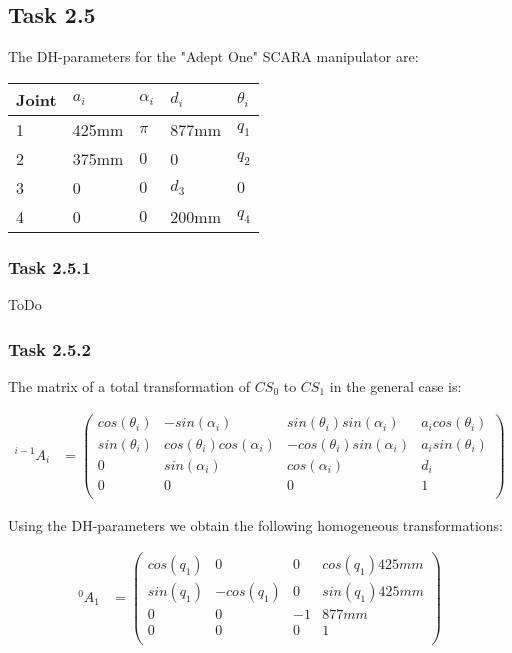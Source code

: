 \subsection*{Task 2.5}
The DH-parameters for the "Adept One" SCARA manipulator are:
\begin{center}
	\begin{tabular}{ | l | l | l | l | l |}
		\hline
		Joint & $a_{i}$ & $\alpha_{i}$ & $d_i$ & $\theta_i$ \\ \hline
		1 & 425mm & $\pi$ & 877mm & $q_1$\\ \hline
		2 & 375mm & $0$ & 0 & $q_2$\\ \hline
		3 & 0 & $0$ & $d_3$ & $0$\\ \hline
		4 & 0 & $0$ & 200mm & $q_4$\\ \hline
	\end{tabular}
\end{center}
\subsubsection*{Task 2.5.1}
ToDo
\subsubsection*{Task 2.5.2}
The matrix of a total transformation of $CS_0$ to $CS_1$ in the general case is:

\begin{align*}
^{i-1}A_i &= 
\begin{pmatrix}
cos(\theta_i) & -sin(\alpha_i) & sin(\theta_i)sin(\alpha_i) & a_icos(\theta_i) \\
sin(\theta_i) & cos(\theta_i)cos(\alpha_i) & -cos(\theta_i)sin(\alpha_i) & a_isin(\theta_i) \\
0 & sin(\alpha_i) & cos(\alpha_i) & d_i \\
0 & 0 & 0 & 1 \\
\end{pmatrix}
\end{align*}

Using the DH-parameters we obtain the following homogeneous transformations:

\begin{align*}
^0A_1 &= 
\begin{pmatrix}
cos(q_1) & 0 & 0 & cos(q_1)425mm \\
sin(q_1) & -cos(q_1) & 0 & sin(q_1)425mm \\
0 & 0 & -1 & 877mm \\
0 & 0 & 0 & 1 \\
\end{pmatrix}
\end{align*}

